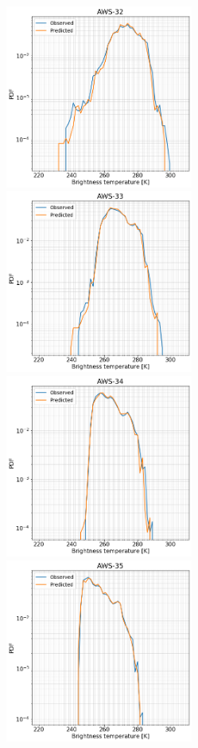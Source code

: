 \documentclass[12pt]{article}
\begin{document}
\begin{figure}[!p]
	\centering
	\includegraphics[height=60mm]{distribution_predicted_C32}\hspace{5mm}%
	\includegraphics[height=60mm]{distribution_predicted_C33}
	\includegraphics[height=60mm]{distribution_predicted_C34}\hspace{5mm}%
	\includegraphics[height=60mm]{distribution_predicted_C35}

\end{figure}
\end{document}
